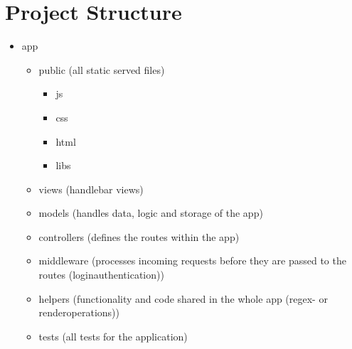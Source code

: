 \documentclass[10pt,a4paper,landscape]{article}
\begin{document}
\section{Project Structure}
\begin{itemize}
        \renewcommand{\labelitemi}{$--$}
        \renewcommand{\labelitemii}{$--$}
        \renewcommand{\labelitemiii}{$--$}
        \renewcommand{\labelitemiv}{$--$}
        \item
            app\\
            \begin{itemize}
                    \item
                        public (all static served files)\\
                        \begin{itemize}
                                \item
                                    js\\
                                \item 
                                    css\\
                                \item 
                                    html\\
                                \item
                                    libs\\
                        \end{itemize}
                    \item
                        views (handlebar views)\\
                    \item
                        models (handles data, logic and storage of the app)\\
                    \item
                        controllers (defines the routes within the app)\\
                    \item
                        middleware (processes incoming requests before they are passed to the routes (loginauthentication))\\
                    \item
                        helpers (functionality and code shared in the whole app (regex- or renderoperations))\\
                    \item
                        tests (all tests for the application)\\
            \end{itemize}
\end{itemize}
\renewcommand{\labelitemi}{$\bullet$}
\renewcommand{\labelitemii}{$\cdot$}
\renewcommand{\labelitemiii}{$\diamond$}
\renewcommand{\labelitemiv}{$\ast$}
\end{document}
